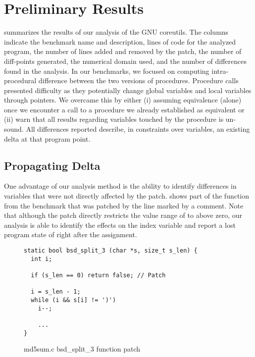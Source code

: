 \section{Preliminary Results}



 summarizes the results of our analysis of the GNU coreutils. The columns indicate the benchmark name and description, lines of code for the analyzed program, the number of lines added and removed by the patch, the number of diff-points generated, the numerical domain used, and the number of differences found in the analysis. In our benchmarks, we focused on computing intra-procedural difference between the two versions of procedures. Procedure calls presented difficulty as they potentially change global variables and local variables through pointers. We overcame this by either (i) assuming equivalence (alone) once we encounter a call to a procedure we already established as equivalent or (ii) warn that all results regarding variables touched by the procedure is un-sound. All differences reported describe, in constraints over variables, an existing delta at that program point.

\subsection{Propagating Delta}
One advantage of our analysis method is the ability to identify differences in variables that were not directly affected by the patch.  shows part of the  function from the  benchmark that was patched by the line marked by a comment. Note that although the patch directly restricts the value range of  to above zero, our analysis is able to identify the effects on the index variable  and report a lost program state of  right after the assignment.

\begin{figure}[ht]
\centering
\begin{lstlisting}
static bool bsd_split_3 (char *s, size_t s_len) {
  int i;

  if (s_len == 0) return false; // Patch

  i = s_len - 1;
  while (i && s[i] != ')')
    i--;

    ...
}
\end{lstlisting}
\caption{md5sum.c bsd\_split\_3 function patch}
\end{figure}

